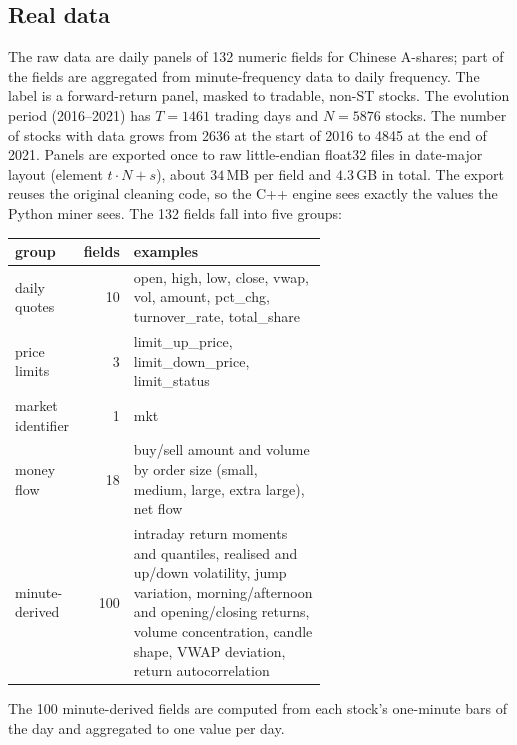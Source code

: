 \documentclass[11pt,a4paper]{article}
\begin{document}
\subsection{Real data}
The raw data are daily panels of 132 numeric fields for Chinese A-shares; part of the fields are aggregated from minute-frequency data to daily frequency. The label is a forward-return panel, masked to tradable, non-ST stocks. The evolution period (2016--2021) has $T=1461$ trading days and $N=5876$ stocks. The number of stocks with data grows from 2636 at the start of 2016 to 4845 at the end of 2021. Panels are exported once to raw little-endian float32 files in date-major layout (element $t\cdot N+s$), about $34$\,MB per field and $4.3$\,GB in total. The export reuses the original cleaning code, so the C++ engine sees exactly the values the Python miner sees.
The 132 fields fall into five groups:
\begin{center}
\begin{tabular}{lrp{0.62\linewidth}}
\toprule
group & fields & examples \\
\midrule
daily quotes & 10 & open, high, low, close, vwap, vol, amount, pct\_chg, turnover\_rate, total\_share \\
price limits & 3 & limit\_up\_price, limit\_down\_price, limit\_status \\
market identifier & 1 & mkt \\
money flow & 18 & buy/sell amount and volume by order size (small, medium, large, extra large), net flow \\
minute-derived & 100 & intraday return moments and quantiles, realised and up/down volatility, jump variation, morning/afternoon and opening/closing returns, volume concentration, candle shape, VWAP deviation, return autocorrelation \\
\bottomrule
\end{tabular}
\end{center}
The 100 minute-derived fields are computed from each stock's one-minute bars of the day and aggregated to one value per day.
\end{document}
